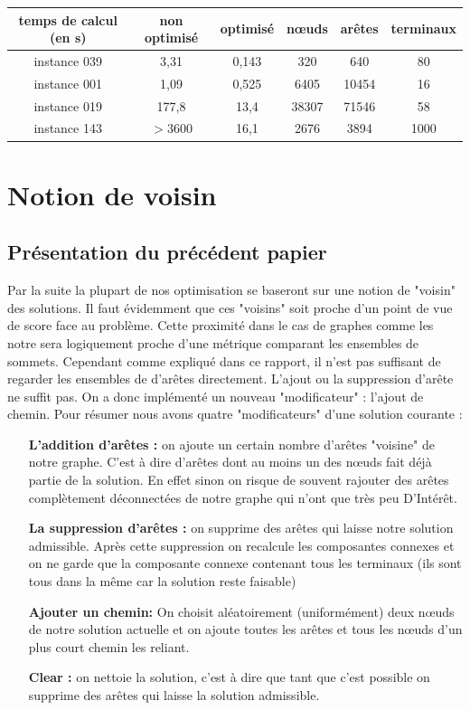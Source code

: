 \documentclass[10pt,a4paper]{article}
\begin{document}
\begin{tabular}{|c|c|c|c|c|c|}
\hline 
temps de calcul (en s) & non optimisé & optimisé & nœuds & arêtes & terminaux \\ 
\hline 
instance 039 & 3,31 & 0,143 & 320 & 640 & 80 \\ 
\hline 
instance 001 & 1,09 & 0,525 & 6405 & 10454 & 16 \\ 
\hline 
instance 019 & 177,8 & 13,4 & 38307 & 71546 & 58 \\ 
\hline 
instance 143 & $>3600$   & 16,1  & 2676 & 3894 & 1000 \\
\hline 
\end{tabular} 

\section{Notion de voisin}


\subsection{Présentation du précédent papier}
Par la suite la plupart de nos optimisation se baseront sur une notion de "voisin" des solutions. Il faut évidemment que ces "voisins" soit proche d'un point de vue de score face au problème. Cette proximité dans le cas de graphes comme les notre sera logiquement proche d'une métrique comparant les ensembles de sommets. Cependant comme expliqué dans ce rapport, il n'est pas suffisant de regarder les ensembles de d’arêtes directement. L'ajout ou la suppression d’arête ne suffit pas. On a donc implémenté un nouveau "modificateur" : l'ajout de chemin. 
Pour résumer nous avons quatre "modificateurs" d'une solution courante :
\begin{itemize}   
\item[\textbf{L'addition  d’arêtes : }] on ajoute un certain nombre d'arêtes "voisine" de notre graphe. C'est à dire d'arêtes dont au moins un des nœuds fait déjà partie de la solution. En effet sinon on risque de souvent rajouter des arêtes complètement déconnectées de notre graphe qui n'ont que très peu D’Intérêt.
\item[\textbf{La suppression d’arêtes : }] on supprime des arêtes qui laisse notre solution admissible. Après cette suppression on recalcule les composantes connexes et on ne garde que la composante connexe contenant tous les terminaux (ils sont tous dans la même car la solution reste faisable) 
\item[\textbf{Ajouter un chemin: }] On choisit aléatoirement (uniformément) deux nœuds de notre solution actuelle et on ajoute toutes les arêtes et tous les nœuds d'un plus court chemin les reliant.
\item[\textbf{Clear : }] on nettoie la solution, c'est à dire que tant que c'est possible on supprime des arêtes qui laisse la solution admissible.
\end{itemize}
\end{document}

